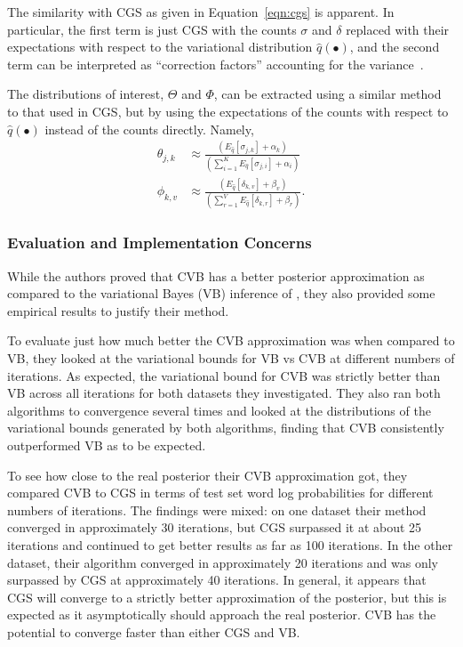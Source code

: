 \documentclass[11pt]{article}
\begin{document}
The similarity with CGS as given in Equation~\ref{eqn:cgs} is apparent. In
particular, the first term is just CGS with the counts $\sigma$ and
$\delta$ replaced with their expectations with respect to the variational
distribution $\hat{q}(\bullet)$, and the second term can be interpreted as
``correction factors'' accounting for the variance~\cite{Teh:2007:CVB}.

The distributions of interest, $\Theta$ and $\Phi$, can be extracted using
a similar method to that used in CGS, but by using the expectations of the
counts with respect to $\hat{q}(\bullet)$ instead of the counts directly.
Namely,
\begin{align}
  \theta_{j,k}
  &\approx
  \frac{(E_{\hat{q}}[\sigma_{j,k}] + \alpha_k)}
  {\left(\sum_{i=1}^K E_{\hat{q}}[\sigma_{j,i}] + \alpha_i\right)}\\
  \phi_{k,v}
  &\approx
  \frac{(E_{\hat{q}}[\delta_{k,v}] + \beta_v)}
  {\left(\sum_{r=1}^V E_{\hat{q}}[\delta_{k,r}] + \beta_r\right)}.
\end{align}

\subsubsection{Evaluation and Implementation Concerns}

While the authors proved that CVB has a better posterior approximation as
compared to the variational Bayes (VB) inference of \citet{Blei:2003:LDA},
they also provided some empirical results to justify their method.

To evaluate just how much better the CVB approximation was when
compared to VB, they looked at the variational bounds for VB vs CVB at
different numbers of iterations. As expected, the variational bound for CVB
was strictly better than VB across all iterations for both datasets they
investigated. They also ran both algorithms to convergence several times
and looked at the distributions of the variational bounds generated by both
algorithms, finding that CVB consistently outperformed VB as to be
expected.

To see how close to the real posterior their CVB approximation got, they
compared CVB to CGS in terms of test set word log probabilities for
different numbers of iterations. The findings were mixed: on one dataset
their method converged in approximately 30 iterations, but CGS surpassed it
at about 25 iterations and continued to get better results as far as 100
iterations. In the other dataset, their algorithm converged in
approximately 20 iterations and was only surpassed by CGS at approximately
40 iterations. In general, it appears that CGS will converge to a strictly
better approximation of the posterior, but this is expected as it
asymptotically should approach the real posterior. CVB has the potential to
converge faster than either CGS and VB.
\end{document}
